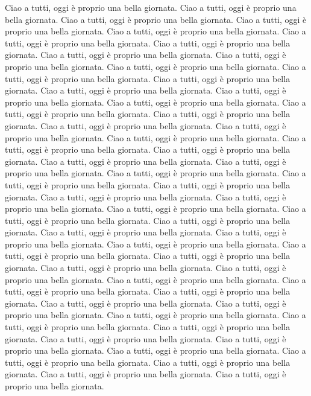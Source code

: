 \documentclass{article}
\begin{document}
Ciao a tutti, oggi è proprio una bella giornata.
Ciao a tutti, oggi è proprio una bella giornata.
Ciao a tutti, oggi è proprio una bella giornata.
Ciao a tutti, oggi è proprio una bella giornata.
Ciao a tutti, oggi è proprio una bella giornata.
Ciao a tutti, oggi è proprio una bella giornata.
Ciao a tutti, oggi è proprio una bella giornata.
Ciao a tutti, oggi è proprio una bella giornata.
Ciao a tutti, oggi è proprio una bella giornata.
Ciao a tutti, oggi è proprio una bella giornata.
Ciao a tutti, oggi è proprio una bella giornata.
Ciao a tutti, oggi è proprio una bella giornata.
Ciao a tutti, oggi è proprio una bella giornata.
Ciao a tutti, oggi è proprio una bella giornata.
Ciao a tutti, oggi è proprio una bella giornata.
Ciao a tutti, oggi è proprio una bella giornata.
Ciao a tutti, oggi è proprio una bella giornata.
Ciao a tutti, oggi è proprio una bella giornata.
Ciao a tutti, oggi è proprio una bella giornata.
Ciao a tutti, oggi è proprio una bella giornata.
Ciao a tutti, oggi è proprio una bella giornata.
Ciao a tutti, oggi è proprio una bella giornata.
Ciao a tutti, oggi è proprio una bella giornata.
Ciao a tutti, oggi è proprio una bella giornata.
Ciao a tutti, oggi è proprio una bella giornata.
Ciao a tutti, oggi è proprio una bella giornata.
Ciao a tutti, oggi è proprio una bella giornata.
Ciao a tutti, oggi è proprio una bella giornata.
Ciao a tutti, oggi è proprio una bella giornata.
Ciao a tutti, oggi è proprio una bella giornata.
Ciao a tutti, oggi è proprio una bella giornata.
Ciao a tutti, oggi è proprio una bella giornata.
Ciao a tutti, oggi è proprio una bella giornata.
Ciao a tutti, oggi è proprio una bella giornata.
Ciao a tutti, oggi è proprio una bella giornata.
Ciao a tutti, oggi è proprio una bella giornata.
Ciao a tutti, oggi è proprio una bella giornata.
Ciao a tutti, oggi è proprio una bella giornata.
Ciao a tutti, oggi è proprio una bella giornata.
Ciao a tutti, oggi è proprio una bella giornata.
Ciao a tutti, oggi è proprio una bella giornata.
Ciao a tutti, oggi è proprio una bella giornata.
Ciao a tutti, oggi è proprio una bella giornata.
Ciao a tutti, oggi è proprio una bella giornata.
Ciao a tutti, oggi è proprio una bella giornata.
Ciao a tutti, oggi è proprio una bella giornata.
Ciao a tutti, oggi è proprio una bella giornata.
Ciao a tutti, oggi è proprio una bella giornata.
Ciao a tutti, oggi è proprio una bella giornata.
Ciao a tutti, oggi è proprio una bella giornata.
Ciao a tutti, oggi è proprio una bella giornata.
Ciao a tutti, oggi è proprio una bella giornata.
Ciao a tutti, oggi è proprio una bella giornata.
Ciao a tutti, oggi è proprio una bella giornata.
\end{document}
